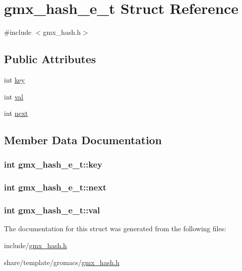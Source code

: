 \hypertarget{structgmx__hash__e__t}{\section{gmx\-\_\-hash\-\_\-e\-\_\-t \-Struct \-Reference}
\label{structgmx__hash__e__t}
}


{\ttfamily \#include $<$gmx\-\_\-hash.\-h$>$}

\subsection*{\-Public \-Attributes}
\begin{DoxyCompactItemize}
\item 
int \hyperlink{structgmx__hash__e__t_afdece2fc577309521363b46c8465aa5f}{key}
\item 
int \hyperlink{structgmx__hash__e__t_a46d0fdf4470a579c697ece4113e6025b}{val}
\item 
int \hyperlink{structgmx__hash__e__t_a9cfbdf66384941678e3c1a2c815daacf}{next}
\end{DoxyCompactItemize}


\subsection{\-Member \-Data \-Documentation}
\hypertarget{structgmx__hash__e__t_afdece2fc577309521363b46c8465aa5f}{
\subsubsection[{key}]{\setlength{\rightskip}{0pt plus 5cm}int {\bf gmx\-\_\-hash\-\_\-e\-\_\-t\-::key}}}\label{structgmx__hash__e__t_afdece2fc577309521363b46c8465aa5f}
\hypertarget{structgmx__hash__e__t_a9cfbdf66384941678e3c1a2c815daacf}{
\subsubsection[{next}]{\setlength{\rightskip}{0pt plus 5cm}int {\bf gmx\-\_\-hash\-\_\-e\-\_\-t\-::next}}}\label{structgmx__hash__e__t_a9cfbdf66384941678e3c1a2c815daacf}
\hypertarget{structgmx__hash__e__t_a46d0fdf4470a579c697ece4113e6025b}{
\subsubsection[{val}]{\setlength{\rightskip}{0pt plus 5cm}int {\bf gmx\-\_\-hash\-\_\-e\-\_\-t\-::val}}}\label{structgmx__hash__e__t_a46d0fdf4470a579c697ece4113e6025b}


\-The documentation for this struct was generated from the following files\-:\begin{DoxyCompactItemize}
\item 
include/\hyperlink{include_2gmx__hash_8h}{gmx\-\_\-hash.\-h}\item 
share/template/gromacs/\hyperlink{share_2template_2gromacs_2gmx__hash_8h}{gmx\-\_\-hash.\-h}\end{DoxyCompactItemize}
